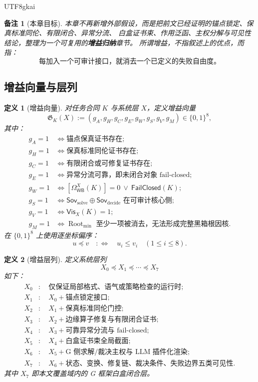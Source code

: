 \documentclass[12pt]{article}
\newtheorem{definition}{定义}[section]
\newtheorem{remark}{备注}[section]
\newcommand{\FailClosed}{\mathsf{FailClosed}}
\newcommand{\WB}{\mathsf{WB}}
\newcommand{\Root}{\operatorname{Root}}
\newcommand{\Sov}{\mathsf{Sov}}
\newcommand{\Vis}{\mathsf{Vis}}
\begin{document}
\begin{CJK*}{UTF8}{gkai}
\begin{remark}[本章目标]
本章不再新增外部假设，而是把前文已经证明的锚点锁定、保真标准同伦、有限闭合、异常分流、
白盒证书束、作用泛函、主权分解与可见性结论，整理为一个可复用的\textbf{增益归纳}章节。
所谓增益，不指叙述上的优点，而指：
\[
  \text{每加入一个可审计接口，就消去一个已定义的失败自由度。}
\]
\end{remark}

\subsection{增益向量与层列}
\label{subsec:tex51-gain-vector}

\begin{definition}[增益向量]
\label{def:tex51-gain-vector}
对任务合同 \(K\) 与系统层 \(X\)，定义增益向量
\[
  \mathfrak G_K(X)
  :=
  (g_A,g_H,g_C,g_E,g_W,g_S,g_V,g_M)\in\{0,1\}^{8},
\]
其中：
\[
\begin{aligned}
  g_A=1&\Longleftrightarrow \text{锚点保真证书存在};\\
  g_H=1&\Longleftrightarrow \text{保真标准同伦证书存在};\\
  g_C=1&\Longleftrightarrow \text{有限闭合或可修复证书存在};\\
  g_E=1&\Longleftrightarrow \text{异常分流可靠，即未闭合对象 fail-closed};\\
  g_W=1&\Longleftrightarrow [\Omega_{\WB}^{X}(K)]=0\ \vee\ \FailClosed(K);\\
  g_S=1&\Longleftrightarrow \Sov_{\mathrm{solve}}\oplus\Sov_{\mathrm{decide}}\text{ 在可审计核心侧};\\
  g_V=1&\Longleftrightarrow \Vis_X(K)=1;\\
  g_M=1&\Longleftrightarrow \Root_{\mathrm{min}}\text{ 至少一项被消去，无法形成完整黑箱根因核}.
\end{aligned}
\]
在 \(\{0,1\}^{8}\) 上使用逐坐标偏序：
\[
  u\preceq v
  \quad:\Longleftrightarrow\quad
  u_i\le v_i\quad(1\le i\le 8).
\]
\end{definition}

\begin{definition}[增益层列]
\label{def:tex51-gain-layers}
定义系统层列
\[
  X_0\preceq X_1\preceq\cdots\preceq X_7
\]
如下：
\[
\begin{aligned}
  X_0&:\quad \text{仅保证局部格式、语气或策略检查的运行时};\\
  X_1&:\quad X_0+\text{锚点锁定接口};\\
  X_2&:\quad X_1+\text{保真标准同伦门控};\\
  X_3&:\quad X_2+\text{边缘算子修复与有限闭合证书};\\
  X_4&:\quad X_3+\text{可靠异常分流与 fail-closed};\\
  X_5&:\quad X_4+\text{白盒证书束全局截面};\\
  X_6&:\quad X_5+\text{G 侧求解/裁决主权与 LLM 插件化渲染};\\
  X_7&:\quad X_6+\text{状态、变换、修复链、裁决条件、失败边界五类可见性}.
\end{aligned}
\]
其中 \(X_7\) 即本文覆盖域内的 G 框架白盒闭合层。
\end{definition}


\end{CJK*}
\end{document}
